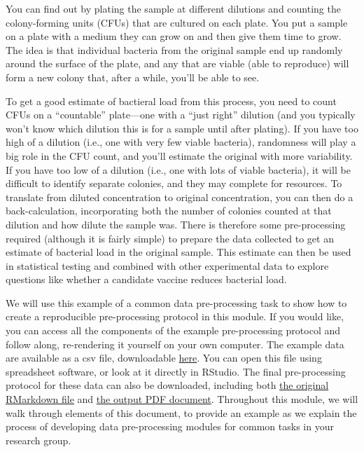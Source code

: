 \documentclass[]{tufte-book}
\begin{document}
You can find out by plating the sample at different dilutions and
counting the colony-forming units (CFUs) that are cultured on each plate.
You put a sample on a plate with a medium they can grow on and then give them
time to grow. The idea is that individual bacteria from the original sample end
up randomly around the surface of the plate, and any that are viable (able to
reproduce) will form a new colony that, after a while, you'll be able to see.

To get a good estimate of bactieral load from this process, you need to count
CFUs on a ``countable'' plate---one with a ``just right'' dilution (and you
typically won't know which dilution this is for a sample until after plating).
If you have too high of a dilution (i.e., one with very few viable bacteria),
randomness will play a big role in the CFU count, and you'll estimate the
original with more variability. If you have too low of a dilution (i.e., one
with lots of viable bacteria), it will be difficult to identify separate
colonies, and they may complete for resources. To translate from diluted
concentration to original concentration, you can then do a back-calculation,
incorporating both the number of colonies counted at that dilution and how
dilute the sample was. There is therefore some pre-processing required (although
it is fairly simple) to prepare the data collected to get an estimate of
bacterial load in the original sample. This estimate can then be used in
statistical testing and combined with other experimental data to explore
questions like whether a candidate vaccine reduces bacterial load.

We will use this example of a common data pre-processing task to show how to
create a reproducible pre-processing protocol in this module. If you would like,
you can access all the components of the example pre-processing protocol and
follow along, re-rendering it yourself on your own computer. The example data
are available as a csv file, downloadable
\href{https://raw.githubusercontent.com/geanders/improve_repro/master/data/bactcountr_example_data/cfu_data.csv}{here}.
You can open this file using spreadsheet software, or look at it directly in
RStudio. The final pre-processing protocol for these data can also be
downloaded, including both \href{https://raw.githubusercontent.com/geanders/improve_repro/master/data/bactcountr_example_data/example_protocol.Rmd}{the original RMarkdown
file}
and \href{https://github.com/geanders/improve_repro/raw/master/data/bactcountr_example_data/example_protocol.pdf}{the output PDF
document}.
Throughout this module, we will walk through elements of this document, to
provide an example as we explain the process of developing data pre-processing
modules for common tasks in your research group.
\end{document}
